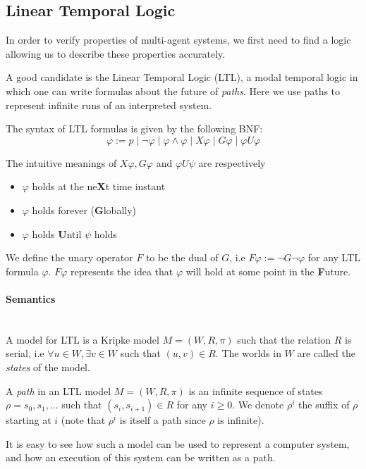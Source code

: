 \documentclass[11pt]{report}
\newenvironment{definition}[1][Definition]{\begin{trivlist}
\item[\hskip \labelsep {\bfseries #1}]}{\end{trivlist}}
\newcommand{\myparagraph}[1]{\paragraph{#1}\mbox{}\\}
\begin{document}
\subsection{Linear Temporal Logic} 
\label{LTL}

In order to verify properties of multi-agent systems, we first need to find a logic allowing us to describe these properties accurately. 

A good candidate is the Linear Temporal Logic (LTL), a modal temporal logic in which one can write formulas about the future of \emph{paths}. Here we use paths to represent infinite runs of an interpreted system. 

\begin{definition} 
The syntax of LTL formulas is given by the following BNF: 
$$\varphi := p \mid \lnot\varphi \mid \varphi \land \varphi \mid X\varphi \mid G\varphi \mid \varphi U\varphi$$
\end{definition}

The intuitive meanings of $X\varphi, G\varphi$ and $\varphi U\psi$ are respectively 
\begin{itemize} 
\item $\varphi$ holds at the ne\textbf{X}t time instant
\item $\varphi$ holds forever (\textbf{G}lobally)
\item $\varphi$ holds \textbf{U}ntil $\psi$ holds  
\end{itemize}

We define the unary operator $F$ to be the dual of $G$, i.e $F\varphi := \lnot G\lnot\varphi$ for any LTL formula $\varphi$. $F\varphi$ represents the idea that $\varphi$ will hold at some point in the \textbf{F}uture.   

\myparagraph{Semantics} 

A model for LTL is a Kripke model $M = (W, R, \pi)$ such that the relation $R$ is serial, i.e $\forall u \in W,  \exists v \in W$ such that $(u, v) \in R$.
The worlds in $W$ are called the \textit{states} of the model. 

\begin{definition} 
A \textit{path} in an LTL model $M = (W, R, \pi)$ is an infinite sequence of states $\rho = s_0, s_1, ...$ such that $(s_i, s_{i+1}) \in R$ for any $i \geq 0$.
We denote $\rho^i$ the suffix of $\rho$ starting at $i$ (note that $\rho^i$ is itself a path since $\rho$ is infinite).
\end{definition}

It is easy to see how such a model can be used to represent a computer system, and how an execution of this system can be written as a path.
\end{document}
